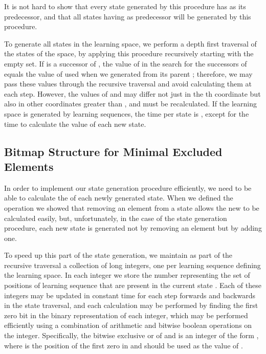 \documentclass[11pt]{llncs}
\begin{document}
{\noindent
It is not hard to show that every state generated by this procedure has  as its predecessor, and that all states having  as predecessor will be generated by this procedure.

To generate all states in the learning space, we perform a depth first traversal of the states of the space, by applying this procedure recursively starting with the empty set.
If  is a successor of , the value of  in the search for the successors of  equals the value of  used when we generated  from its parent ; therefore, we may pass these  values through the recursive traversal and avoid calculating them at each step.  However, the  values of  and  may differ not just in the th coordinate but also in other coordinates greater than , and must be recalculated.
If the learning space is generated by  learning sequences, the time per state is ,
except for the time to calculate the  value of each new state.

\subsection{Bitmap Structure for Minimal Excluded Elements}

In order to implement our state generation procedure efficiently, we need to be able to calculate the  of each newly generated state. When we defined the  operation we showed that removing an element from a state allows the new  to be calculated easily, but, unfortunately, in the case of the state generation procedure, each new state is generated not by removing an element but by adding one.

To speed up this part of the state generation, we maintain as part of the recursive traversal a collection of long integers, one per learning sequence defining the learning space. In each integer  we store the number  representing the set of positions of learning sequence  that are present in the current state . Each of these integers may be updated in constant time for each step forwards and backwards in the state traversal, and each  calculation may be performed by finding the first zero bit in the binary representation of each integer,
which may be performed efficiently using a combination of arithmetic and bitwise boolean operations on the integer. Specifically, the bitwise exclusive or of  and  is an integer of the form , where  is the position of the first zero in  and should be used as the value of .

}
\end{document}
